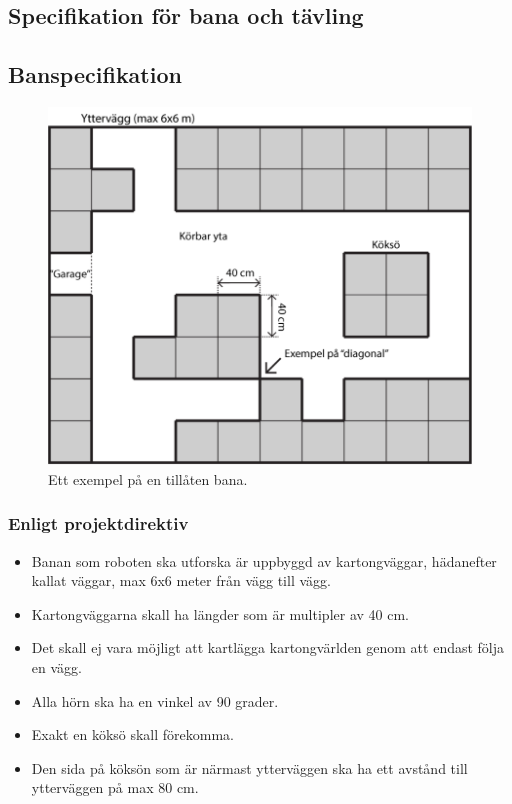 \documentclass[a4paper,11pt]{article}
\begin{document}
\clearpage

\begin{appendices}

\section{Specifikation för bana och tävling}

\subsection{Banspecifikation} \label{sec:courseSpecification}

\begin{figure}[h!]
\centering
\includegraphics[scale=0.30]{banexempel.png}
\caption{Ett exempel på en tillåten bana.}
\end{figure}

\subsubsection{Enligt projektdirektiv}
\begin{itemize}
    \item Banan som roboten ska utforska är uppbyggd av kartongväggar, hädanefter kallat väggar, max 6x6 meter från vägg till vägg.
    \item Kartongväggarna skall ha längder som är multipler av 40 cm.
    \item Det skall ej vara möjligt att kartlägga kartongvärlden genom att endast följa en vägg.
    \item Alla hörn ska ha en vinkel av 90 grader.
    \item Exakt en köksö skall förekomma.
    \item Den sida på köksön som är närmast ytterväggen ska ha ett avstånd till ytterväggen på max 80 cm.
\end{itemize}


\end{appendices}
\end{document}
